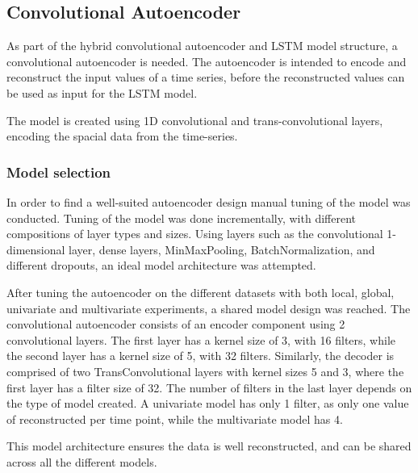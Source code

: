 
\subsection{Convolutional Autoencoder}
\label{section:Method:CNN-AE-LSTM:AE}



As part of the hybrid convolutional autoencoder and LSTM model structure,
a convolutional autoencoder is needed.
The autoencoder is intended to encode and reconstruct the input values of a time series,
before the reconstructed values can be used as input for the LSTM model.

The model is created using 1D convolutional and trans-convolutional layers,
encoding the spacial data from the time-series.


\subsubsection{Model selection}

In order to find a well-suited autoencoder design manual tuning of the model was conducted.
Tuning of the model was done incrementally, with different compositions of layer types and sizes.
Using layers such as the convolutional 1-dimensional layer, dense layers, MinMaxPooling, BatchNormalization, and different dropouts,
an ideal model architecture was attempted.

After tuning the autoencoder on the different datasets with both local, global, univariate and multivariate experiments,
a shared model design was reached.
The convolutional autoencoder consists of an encoder component using 2 convolutional layers.
The first layer has a kernel size of 3, with 16 filters, while the second layer has a kernel size of 5, with 32 filters.
Similarly, the decoder is comprised of two TransConvolutional layers with kernel sizes 5 and 3, where the first layer has a filter size of 32.
The number of filters in the last layer depends on the type of model created. A univariate model has only 1 filter, as only one value of reconstructed per time point,
while the multivariate model has 4.

This model architecture ensures the data is well reconstructed,
and can be shared across all the different models.



